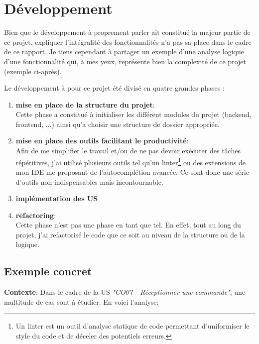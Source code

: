 \section{Développement}

Bien que le développement à proprement parler ait constitué la majeur partie de ce projet, expliquer l'intégralité des fonctionnalités n'a pas sa place dans le cadre de ce rapport. Je tiens cependant à partager un exemple d'une analyse logique d'une fonctionnalité qui, à mes yeux, représente bien la complexité de ce projet (exemple ci-après). 

\newpara

Le développement à pour ce projet été divisé en quatre grandes phases :
\begin{enumerate}
  \item \textbf{mise en place de la structure du projet}: \\ Cette phase a constitué à initialiser les différent modules du projet (backend, frontend, ...) ainsi qu'a choisir une structure de dossier appropriée. 
  \item\textbf{mise en place des outils facilitant le productivité}: \\ Afin de me simplifier le travail et/ou de ne pas devoir exécuter des tâches répétitives, j'ai utilisé plusieurs outils tel qu'un linter\footnote{Un linter est un outil d'analyse statique de code permettant d'uniformiser le style du code et de déceler des potentiels erreurs.} ou des extensions de mon IDE me proposant de l'autocomplétion avancée. Ce sont donc une série d'outils non-indispensables mais incontournable. 
  \item \textbf{implémentation des US}
  \item \textbf{refactoring}: \\ Cette phase n'est pas une phase en tant que tel. En effet, tout au long du projet, j'ai refactorisé le code que ce soit au niveau de la structure ou de la logique. 
\end{enumerate}

\subsection{Exemple concret}
\textbf{Contexte}: Dans le cadre de la US \textit{"CO07 - Réceptionner une commande"}, une multitude de cas sont à étudier. En voici l'analyse: 

\newpara

